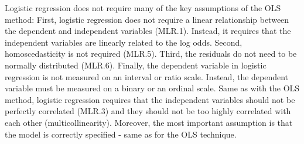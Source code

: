 Logistic regression does not require many of the key assumptions of the OLS method: First, logistic regression does not require a linear relationship between the dependent and independent variables (MLR.1). Instead, it requires that the independent variables are linearly related to the log odds. Second, homoscedasticity is not required (MLR.5). Third, the residuals do not need to be normally distributed (MLR.6). Finally, the dependent variable in logistic regression is not measured on an interval or ratio scale. Instead, the dependent variable must be measured on a binary or an ordinal scale. Same as with the OLS method, logistic regression requires that the independent variables should not be perfectly correlated (MLR.3) and they should not be too highly correlated with each other (multicollinearity). \citep{logitassumption} Moreover, the most important assumption is that the model is correctly specified - same as for the OLS technique. \citep[p. 2 ff.]{menard1995introduction}

